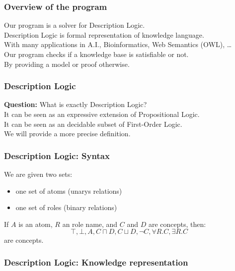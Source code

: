 \begin{frame}
  \frametitle{Overview of the program}
  Our program is a solver for Description Logic. \\
  \pause
  \smallskip
  Description Logic is formal representation of knowledge language. \\
  With many applications in A.I., Bioinformatics, Web Semantics (OWL), \dots \\
  \pause
  \bigskip
  Our program checks if a knowledge base is satisfiable or not. \\
  By providing a model or proof otherwise. \\
\end{frame}

\begin{frame}
\frametitle{Description Logic}
{\bf Question:} What is exactly Description Logic? \\
\pause
\bigskip
It can be seen as an expressive extension of Propositional Logic. \pause \\
It can be seen as an decidable subset of First-Order Logic. \\
\pause \smallskip
We will provide a more precise definition.
\end{frame}

\begin{frame}
\frametitle{Description Logic: Syntax}
We are given two sets: 
\begin{itemize}
\item one set of atoms (unarys relations)
\item one set of roles (binary relations)
\end{itemize}
\bigskip
If $A$ is an atom, $R$ an role name, and $C$ and $D$ are concepts, then:
\pause
\[
\top , \bot , A , C \sqcap D , C \sqcup D, 
\neg C , \forall R . C, \exists R . C 
\]
are concepts.
\end{frame}

\begin{frame}

\end{frame}

\begin{frame}
\frametitle{Description Logic: Knowledge representation}
\end{frame}
